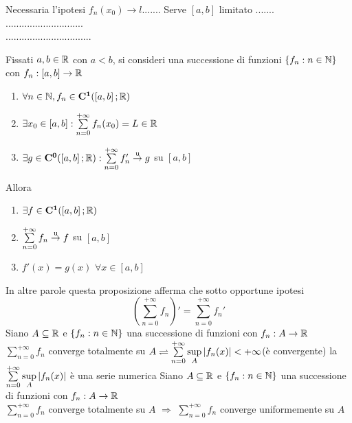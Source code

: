 \observation
Necessaria l'ipotesi $f_n(x_0)\to l$.......
\observation
Serve $\left[a,b\right]$ limitato .......\\
.............................\\
................................\\
\begin{corollary}
	\label{coro:deriv_series_series_of_deriv}
	Fissati $a,b\in \mathbb{R}$ con $a<b$, si consideri una successione di funzioni $\left\{f_n:n\in\mathbb{N}\right\}$ con $f_n:\left[a,b\right]\to \mathbb{R}$
	\begin{enumerate}
		\item $\forall n\in\mathbb{N}, f_n\in \mathbf{C^{1}}(\left[a,b\right]; \mathbb{R})$
		\item $\exists x_0\in\left[a,b\right]: \sum\limits_{n=0}^{+\infty}f_n(x_0)=L\in \mathbb{R}$
		\item $\exists g \in \mathbf{C^{0}}(\left[a,b\right]; \mathbb{R}): \sum\limits_{n=0}^{+\infty}f'_n \overset{\text{u}}{\to} g$ su $\left[a,b\right]$
	\end{enumerate}
	Allora
	\begin{enumerate}
		\item $\exists f\in \mathbf{C^{1}}(\left[a,b\right]; \mathbb{R})$
		\item $\sum\limits_{n=0}^{+\infty}f_n \overset{\text{u}}{\to} f$ su $\left[a,b\right]$
		\item $f'(x)=g(x)$ $\forall x\in\left[a,b\right]$
	\end{enumerate}
\end{corollary}
\observation
In altre parole questa proposizione afferma che sotto opportune ipotesi
$$\left(\sum\limits_{n=0}^{+\infty} f_n \right)' =  \sum\limits_{n=0}^{+\infty}f_n'$$
Siano $A\subseteq  \mathbb{R}$ e $\left\{f_n:n\in\mathbb{N}\right\}$ una successione di funzioni con $f_n:A\to \mathbb{R}$\\
$\sum\limits_{n=0}^{+\infty}f_n$ converge totalmente su $A \rightleftharpoons \sum\limits_{n=0}^{+\infty}\sup\limits_{A}\left|f_n(x)\right|<+\infty$(è convergente)
\observation
la $\sum\limits_{n=0}^{+\infty}\sup\limits_{A}\left|f_n(x)\right|$ è una serie numerica
\proposition
Siano $A\subseteq \mathbb{R}$ e $\left\{f_n:n\in\mathbb{N}\right\}$ una successione di funzioni con $f_n:A\to \mathbb{R}$\\
$\sum\limits_{n=0}^{+\infty}f_n$ converge totalmente su $A$ $\Rightarrow$  $\sum\limits_{n=0}^{+\infty}f_n$ converge uniformemente su $A$
